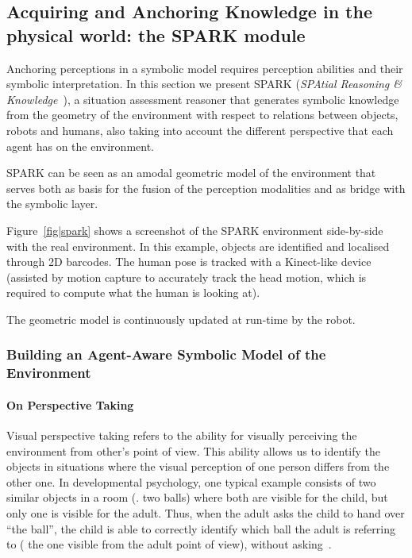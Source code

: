 \subsection{Acquiring and Anchoring Knowledge in the physical world: the SPARK module}
\label{sect|spark}

Anchoring perceptions in a symbolic model requires perception abilities and
their symbolic interpretation. In this section we present SPARK (\emph{SPAtial
Reasoning \& Knowledge}~\cite{Sisbot2011}), a situation assessment reasoner
that generates symbolic knowledge from the geometry of the environment with
respect to relations between objects, robots and humans, also taking into
account the different perspective that each agent has on the environment.

SPARK can be seen as an amodal geometric model of the environment that serves
both as basis for the fusion of the perception modalities and as bridge with
the symbolic layer.

Figure~\ref{fig|spark} shows a screenshot of the SPARK environment side-by-side
with the real environment. In this example, objects are
identified and localised through 2D barcodes. The human pose is tracked with
a Kinect-like device (assisted by motion capture to accurately track the
head motion, which is required to compute what the human is looking at).

The geometric model is continuously updated at run-time by the robot.

\subsubsection{Building an Agent-Aware Symbolic Model of the Environment}
\label{sect|situ}

\paragraph{On Perspective Taking} Visual perspective taking refers to the
ability for visually perceiving the environment from other's point of view.
This ability allows us to identify the objects in situations where the visual
perception of one person differs from the other one. In developmental
psychology, one typical example consists of two similar objects in a room (\eg.
two balls) where both are visible for the child, but only one is visible for
the adult. Thus, when the adult asks the child to hand over ``the ball'', the
child is able to correctly identify which ball the adult is referring to (\ie
the one visible from the adult point of view), without asking~\cite{Moll2006}.

